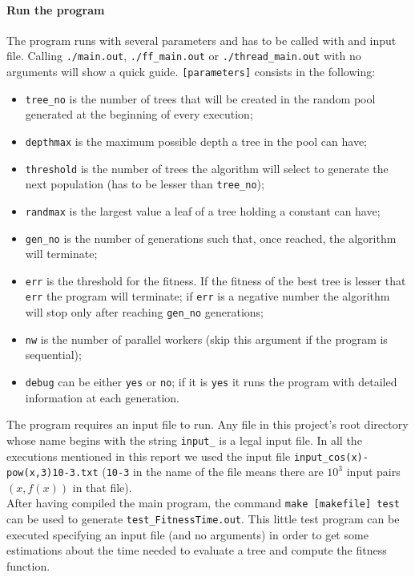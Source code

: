 \documentclass[10pt]{article}
\numberwithin{equation}{section}
\begin{document}
\begin{itemize}
\paragraph{Run the program}
The program runs with several parameters and has to be called with and input file. Calling \verb|./main.out|, \verb|./ff_main.out| or \verb|./thread_main.out| with no arguments will show a quick guide. \verb|[parameters]| consists in the following: 
\begin{itemize}
	\item \verb|tree_no| is the number of trees that will be created in the random pool generated at the beginning of every execution;
	\item \verb|depthmax| is the maximum possible depth a tree in the pool can have;
	\item \verb|threshold| is the number of trees the algorithm will select to generate the next population (has to be lesser than \verb|tree_no|);
	\item \verb|randmax| is the largest value a leaf of a tree holding a constant can have;
	\item \verb|gen_no| is the number of generations such that, once reached, the algorithm will terminate;
	\item \verb|err| is the threshold for the fitness. If the fitness of the best tree is lesser that \verb|err| the program will terminate; if \verb|err| is a negative number the algorithm will stop only after reaching \verb|gen_no| generations;
	\item \verb|nw| is the number of parallel workers (skip this argument if the program is sequential);
	\item \verb|debug| can be either \verb|yes| or \verb|no|; if it is \verb|yes| it runs the program with detailed information at each generation.	   
\end{itemize}
The program requires an input file to run. Any file in this project's root directory whose name begins with the string \verb|input_| is a legal input file. In all the executions mentioned in this report we used the input file \verb|input_cos(x)-pow(x,3)10-3.txt| (\verb|10-3| in the name of the file means there are $10^3$ input pairs $(x,f(x))$ in that file).\\
After having compiled the main program, the command \verb|make [makefile] test| can be used to generate \verb|test_FitnessTime.out|. This little test program can be executed specifying an input file (and no arguments) in order to get some estimations about the time needed to evaluate a tree and compute the fitness function.
\end{itemize}
\end{document}
